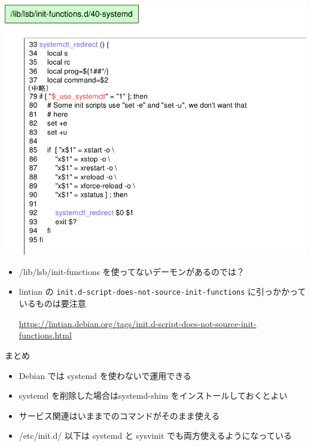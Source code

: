 \begin{frame}
\begin{center}
\includegraphics[width=1\hsize]{image201510/daemonscript3.png}
\end{center}
\end{frame}

\begin{frame}
\begin{itemize}
\item /lib/lsb/init-functions を使ってないデーモンがあるのでは？
\item lintian の \texttt{init.d-script-does-not-source-init-functions} に引っかかっているものは要注意

\url{https://lintian.debian.org/tags/init.d-script-does-not-source-init-functions.html}
\end{itemize}
\end{frame}

\begin{frame}{まとめ}

\begin{itemize}
\item Debian では systemd を使わないで運用できる
\item systemd を削除した場合はsystemd-shim をインストールしておくとよい
\item サービス関連はいままでのコマンドがそのまま使える
\item /etc/init.d/ 以下は systemd と sysvinit でも両方使えるようになっている
\end{itemize}

\end{frame}

